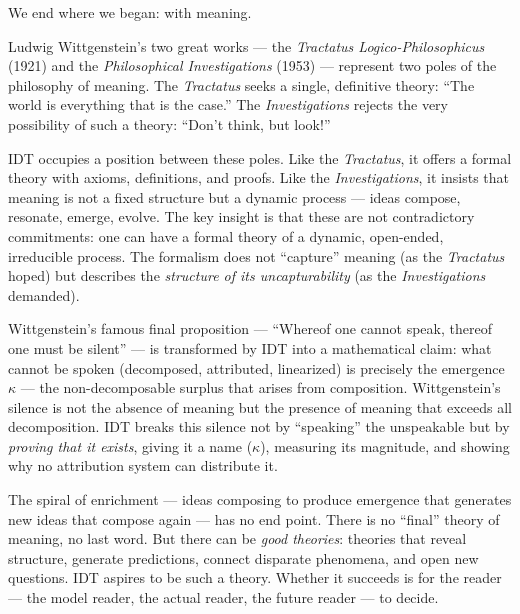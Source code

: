 \begin{interpretation}
\label{interp:ch22:wittgenstein_final}
We end where we began: with meaning.

Ludwig Wittgenstein's two great works --- the \textit{Tractatus
Logico-Philosophicus} (1921) and the \textit{Philosophical Investigations}
(1953) --- represent two poles of the philosophy of meaning.  The
\textit{Tractatus} seeks a single, definitive theory: ``The world is
everything that is the case.''  The \textit{Investigations} rejects the
very possibility of such a theory: ``Don't think, but look!''

IDT occupies a position between these poles.  Like the \textit{Tractatus},
it offers a formal theory with axioms, definitions, and proofs.  Like the
\textit{Investigations}, it insists that meaning is not a fixed structure
but a dynamic process --- ideas compose, resonate, emerge, evolve.  The
key insight is that these are not contradictory commitments: one can have
a formal theory of a dynamic, open-ended, irreducible process.  The
formalism does not ``capture'' meaning (as the \textit{Tractatus} hoped)
but describes the \emph{structure of its uncapturability} (as the
\textit{Investigations} demanded).

Wittgenstein's famous final proposition --- ``Whereof one cannot speak,
thereof one must be silent'' --- is transformed by IDT into a mathematical
claim: what cannot be spoken (decomposed, attributed, linearized) is
precisely the emergence $\kappa$ --- the non-decomposable surplus that
arises from composition.  Wittgenstein's silence is not the absence of
meaning but the presence of meaning that exceeds all decomposition.  IDT
breaks this silence not by ``speaking'' the unspeakable but by
\emph{proving that it exists}, giving it a name ($\kappa$), measuring its
magnitude, and showing why no attribution system can distribute it.

The spiral of enrichment --- ideas composing to produce emergence that
generates new ideas that compose again --- has no end point.  There is
no ``final'' theory of meaning, no last word.  But there can be
\emph{good theories}: theories that reveal structure, generate
predictions, connect disparate phenomena, and open new questions.  IDT
aspires to be such a theory.  Whether it succeeds is for the reader ---
the model reader, the actual reader, the future reader --- to decide.
\end{interpretation}

